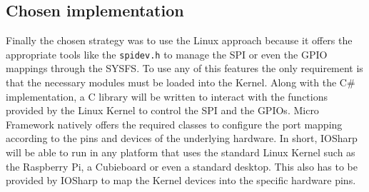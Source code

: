 \subsection{Chosen implementation}\label{SS:IOSharp-choosen}
Finally the chosen strategy was to use the Linux approach because it offers the appropriate tools like the \verb!spidev.h! to manage the SPI or even the GPIO mappings through the \gls{SYSFS}. To use any of this features the only requirement is that the necessary modules must be loaded into the Kernel. Along with the C\# implementation, a C library will be written to interact with the functions provided by the Linux Kernel to control the \gls{SPI} and the \gls{GPIO}s.
Micro Framework natively offers the required classes to configure the port mapping according to the pins and devices of the underlying hardware. In short, IOSharp will be able to run in any platform that uses the standard Linux Kernel such as the Raspberry Pi, a Cubieboard or even a standard desktop. This also has to be provided by IOSharp to map the Kernel devices into the specific hardware pins.

